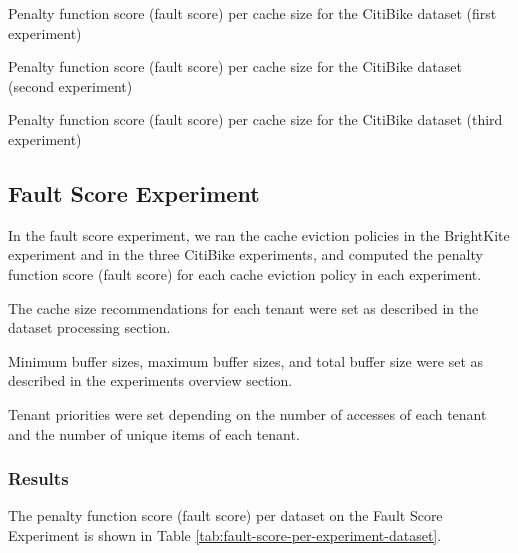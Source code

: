 \begin{table}[ht]
    \centering
    \small
    \caption{Penalty function score (fault score) per cache size for the CitiBike dataset (first experiment)}
    \label{tab:fault-score-per-buffer-size-citibike}
\end{table}

\begin{table}[ht]
    \centering
    \small
    \caption{Penalty function score (fault score) per cache size for the CitiBike dataset (second experiment)}
    \label{tab:fault-score-per-buffer-size-citibike-2}
\end{table}

\begin{table}[ht]
    \centering
    \small
    \caption{Penalty function score (fault score) per cache size for the CitiBike dataset (third experiment)}
    \label{tab:fault-score-per-buffer-size-citibike-3}
\end{table}

\subsection{Fault Score Experiment}

In the fault score experiment, we ran the cache eviction policies in the BrightKite experiment 
and in the three CitiBike experiments, and computed the penalty function score (fault score) 
for each cache eviction policy in each experiment.

The cache size recommendations for each tenant were set as described in the dataset processing 
section.

Minimum buffer sizes, maximum buffer sizes, and total buffer size were set as described in 
the experiments overview section.

Tenant priorities were set depending on the number of accesses of each tenant and the number of
unique items of each tenant.

\subsubsection*{Results}

The penalty function score (fault score) per dataset on the Fault Score Experiment is shown in
Table \ref{tab:fault-score-per-experiment-dataset}.

